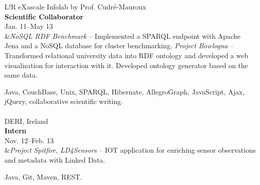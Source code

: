 \documentclass[11pt]{article}
\newcommand\VRule{\color{lightgray}\vrule width 0.5pt}
\begin{document}
\begin{tabular}{L!{\VRule}R}
eXascale Infolab by Prof. Cudr\'e-Mauroux\\
{\bf Scientific Collaborator}\\
Jan. 11--May 13\\&{\it NoSQL RDF Benchmark} -- Implemented a SPARQL endpoint
with Apache Jena and a NoSQL database for cluster benchmarking. \cite{nosqlrdf}
{\it Project Bowlogna} -- Transformed relational
university data into RDF ontology and developed a web visualization for
interaction with it. Developed ontology generator based on the same data. \cite{
bowlognaBench, bowlFost}

Java, CouchBase, Unix,
SPARQL, Hibernate, AllegroGraph, JavaScript, Ajax, jQuery,
collaborative scientific writing.\\
\\
DERI, Ireland\\
{\bf Intern}\\
Nov. 12--Feb. 13\\
&{\it Project Spitfire, LD4Sensors} -- IOT application for enriching sensor
observations and metadata with Linked Data.

Java, Git, Maven, REST.\\





\end{tabular}
\end{document}
